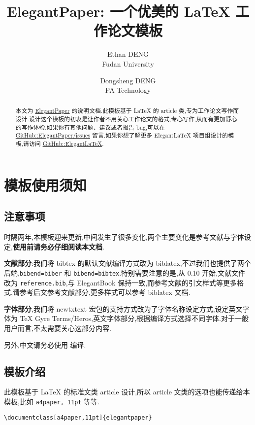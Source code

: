 \documentclass[lang=cn,a4paper]{elegantpaper}
\title{ElegantPaper: 一个优美的 \LaTeX{} 工作论文模板}
\author{Ethan DENG \\ Fudan University \and Dongsheng DENG \\ PA Technology}
\institute{\href{https://elegantlatex.org/}{Elegant\LaTeX{} 项目组}}
\date{\zhtoday}
\begin{document}
\maketitle

\begin{abstract}
本文为 \href{https://github.com/ElegantLaTeX/ElegantPaper/}{ElegantPaper} 的说明文档.此模板基于 \LaTeX{} 的 article 类,专为工作论文写作而设计.设计这个模板的初衷是让作者不用关心工作论文的格式,专心写作,从而有更加舒心的写作体验.如果你有其他问题、建议或者报告 bug,可以在 \href{https://github.com/ElegantLaTeX/ElegantPaper/issues}{GitHub::ElegantPaper/issues} 留言.如果你想了解更多 Elegant\LaTeX{} 项目组设计的模板,请访问 \href{https://github.com/ElegantLaTeX/}{GitHub::ElegantLaTeX}.
\end{abstract}

\section{模板使用须知}

\subsection{注意事项}

时隔两年,本模板迎来更新,中间发生了很多变化,两个主要变化是参考文献与字体设定,\textbf{使用前请务必仔细阅读本文档}.

\textbf{文献部分}:我们将 bibtex 的默认文献编译方式改为 biblatex,不过我们也提供了两个后端,\lstinline{bibend=biber} 和 \lstinline{bibend=bibtex}.特别需要注意的是,从 0.10 开始,文献文件改为 \lstinline{reference.bib},与 ElegantBook 保持一致,而参考文献的引文样式等更多格式,请参考后文参考文献部分,更多样式可以参考 biblatex 文档. 

\textbf{字体部分},我们将 newtxtext 宏包的支持方式改为了字体名称设定方式,设定英文字体为 TeX Gyre Terms/Heros,英文字体部分,根据编译方式选择不同字体.对于一般用户而言,不太需要关心这部分内容.

另外,中文请务必使用  编译.

\subsection{模板介绍}

此模板基于 \LaTeX{} 的标准文类 article 设计,所以 article 文类的选项也能传递给本模板,比如 \lstinline{a4paper, 11pt} 等等.

\begin{lstlisting}
\documentclass[a4paper,11pt]{elegantpaper}
\end{lstlisting}
\end{document}

